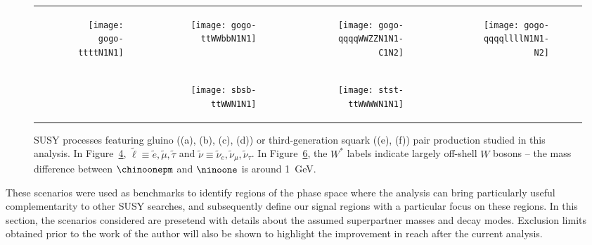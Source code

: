 \begin{figure}[t!]
\centering
\begin{tabular}{rrrr}
\begin{subfigure}[t]{0.24\textwidth}{\texttt{[image: gogo-ttttN1N1]}\label{fig:feynman_gtt}} \caption{} \end{subfigure}&
\begin{subfigure}[t]{0.24\textwidth}{\texttt{[image: gogo-ttWWbbN1N1]}\label{fig:feynman_gttOffshell}} \caption{} \end{subfigure}&
\begin{subfigure}[t]{0.24\textwidth}{\texttt{[image: gogo-qqqqWWZZN1N1-C1N2]}\label{fig:feynman_gg2WZ}} \caption{} \end{subfigure}&
\begin{subfigure}[t]{0.24\textwidth}{\texttt{[image: gogo-qqqqllllN1N1-N2]}\label{fig:feynman_gg2sl}}  \caption{} \end{subfigure} \\
&
\begin{subfigure}[t]{0.24\textwidth}{\texttt{[image: sbsb-ttWWN1N1]}\label{fig:feynman_b1b1}} \caption{} \end{subfigure} &
\begin{subfigure}[t]{0.24\textwidth}{\texttt{[image: stst-ttWWWWN1N1]}\label{fig:feynman_t1t1}} \caption{} \end{subfigure} &
 \\
\end{tabular}
\caption{SUSY processes featuring gluino ((a), (b), (c), (d)) or third-generation squark ((e), (f)) pair production studied in this analysis. 
 In Figure~\ref{fig:feynman_gg2sl}, $\tilde{\ell} \equiv \tilde{e}, \tilde{\mu}, \tilde{\tau}$ and 
$\tilde{\nu} \equiv \tilde{\nu}_e, \tilde{\nu}_{\mu}, \tilde{\nu}_{\tau}$. In Figure~\ref{fig:feynman_t1t1}, the $W^*$ labels indicate 
largely off-shell $W$ bosons -- the mass difference between $\chinoonepm$ and $\ninoone$ is around 1~GeV.}
\label{fig:feynman}
\end{figure}

These scenarios were used as benchmarks to identify regions of the phase space 
where the analysis can bring particularly useful complementarity to other SUSY 
searches, 
and subsequently define our signal regions with a particular focus on these 
regions. 
In this section, the scenarios considered are presetend with details about 
the assumed superpartner masses and decay modes.  
Exclusion limits obtained prior to the work of the author will also 
be shown to highlight the improvement in reach after the current analysis.


